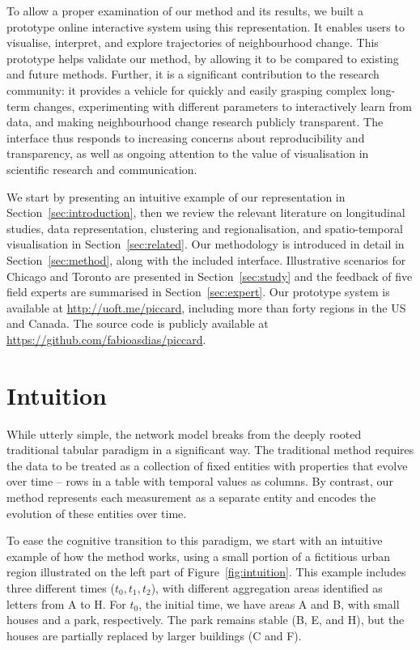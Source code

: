 To allow a proper examination of our method and its results, we built a prototype online
interactive system using this representation. It enables users to visualise,
interpret, and explore trajectories of neighbourhood change. This prototype
helps validate our method, by allowing it to be compared to existing and future
methods. Further, it is a significant contribution to the research community: it
provides a vehicle for quickly and easily grasping complex long-term changes,
experimenting with different parameters to interactively learn from data, and
making neighbourhood change research publicly transparent. The interface thus
responds to increasing concerns about reproducibility and transparency, as well
as ongoing attention to the value of visualisation in scientific research and
communication.


We start by presenting an intuitive example of our representation in
Section~\ref{sec:introduction}, then we review the relevant literature on
longitudinal studies, data representation, clustering and regionalisation, and
spatio-temporal visualisation in Section~\ref{sec:related}. Our methodology is
introduced in detail in Section~\ref{sec:method}, along with the included
interface. Illustrative scenarios for Chicago and Toronto are presented in
Section~\ref{sec:study} and the feedback of five field experts are summarised in
Section~\ref{sec:expert}. Our prototype system is available at
\url{http://uoft.me/piccard}, including more than forty regions in the US and
Canada. The source code is publicly available at
\url{https://github.com/fabioasdias/piccard}.


\section{Intuition}
\label{sec:intuition}
While utterly simple, the network model breaks from the deeply rooted
traditional tabular paradigm in a significant way. The traditional method
requires the data to be treated as a collection of fixed entities with
properties that evolve over time -- rows in a table with temporal values as
columns. By contrast, our method represents each measurement as a separate
entity and encodes the evolution of these entities over time.

To ease the cognitive transition to this paradigm, we start with an intuitive
example of how the method works, using a small portion of a fictitious urban
region illustrated on the left part of Figure~\ref{fig:intuition}. This example
includes three different times ($t_0,t_1,t_2$), with different aggregation areas
identified as letters from A to H. For $t_0$, the initial time, we have areas A
and B, with small houses and a park, respectively. The park remains stable (B,
E, and H), but the houses are partially replaced by larger buildings (C and F). 

